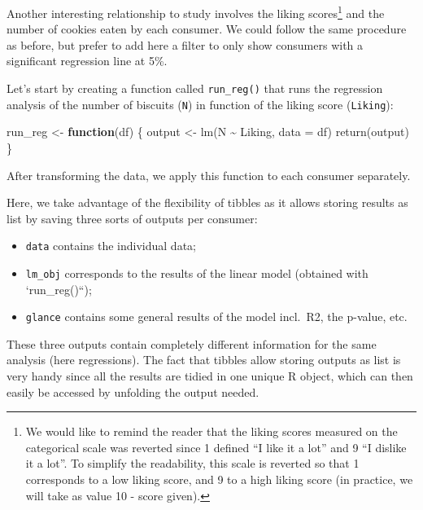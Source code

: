 \documentclass[
]{krantz}
\makeatletter
\newenvironment{Shaded}{\begin{snugshade}}{\end{snugshade}}
\newcommand{\AttributeTok}[1]{\textcolor[rgb]{0.61,0.61,0.61}{#1}}
\newcommand{\ControlFlowTok}[1]{\textcolor[rgb]{0.27,0.27,0.27}{\textbf{#1}}}
\newcommand{\FunctionTok}[1]{\textcolor[rgb]{0,0,0}{#1}}
\newcommand{\NormalTok}[1]{#1}
\newcommand{\OtherTok}[1]{\textcolor[rgb]{0.37,0.37,0.37}{#1}}
\newcommand{\SpecialCharTok}[1]{\textcolor[rgb]{0,0,0}{#1}}
\providecommand{\tightlist}{%
  \setlength{\itemsep}{0pt}\setlength{\parskip}{0pt}}
\renewenvironment{quote}{\begin{VF}}{\end{VF}}
\newenvironment{kframe}{%
\medskip{}
\setlength{\fboxsep}{.8em}
 \def\at@end@of@kframe{}%
 \ifinner\ifhmode%
  \def\at@end@of@kframe{\end{minipage}}%
  \begin{minipage}{\columnwidth}%
 \fi\fi%
 \def\FrameCommand##1{\hskip\@totalleftmargin \hskip-\fboxsep
 \colorbox{shadecolor}{##1}\hskip-\fboxsep
     \hskip-\linewidth \hskip-\@totalleftmargin \hskip\columnwidth}%
 \MakeFramed {\advance\hsize-\width
   \@totalleftmargin\z@ \linewidth\hsize
   \@setminipage}}%
 {\par\unskip\endMakeFramed%
 \at@end@of@kframe}
\renewenvironment{Shaded}{\begin{kframe}}{\end{kframe}}
\makeatother
\begin{document}
Another interesting relationship to study involves the liking scores\footnote{We would like to remind the reader that the liking scores measured on the categorical scale was reverted since 1 defined ``I like it a lot'' and 9 ``I dislike it a lot''. To simplify the readability, this scale is reverted so that 1 corresponds to a low liking score, and 9 to a high liking score (in practice, we will take as value 10 - score given).} and the number of cookies eaten by each consumer. We could follow the same procedure as before, but prefer to add here a filter to only show consumers with a significant regression line at 5\%.

Let's start by creating a function called \texttt{run\_reg()} that runs the regression analysis of the number of biscuits (\texttt{N}) in function of the liking score (\texttt{Liking}):

\begin{Shaded}
\begin{Highlighting}[]
\NormalTok{run\_reg }\OtherTok{\textless{}{-}} \ControlFlowTok{function}\NormalTok{(df) \{}
\NormalTok{  output }\OtherTok{\textless{}{-}} \FunctionTok{lm}\NormalTok{(N }\SpecialCharTok{\textasciitilde{}}\NormalTok{ Liking, }\AttributeTok{data =}\NormalTok{ df)}
  \FunctionTok{return}\NormalTok{(output)}
\NormalTok{\}}
\end{Highlighting}
\end{Shaded}

After transforming the data, we apply this function to each consumer separately.

Here, we take advantage of the flexibility of tibbles as it allows storing results as list by saving three sorts of outputs per consumer:

\begin{itemize}
\tightlist
\item
  \texttt{data} contains the individual data;
\item
  \texttt{lm\_obj} corresponds to the results of the linear model (obtained with `run\_reg()``);
\item
  \texttt{glance} contains some general results of the model incl.~R2, the p-value, etc.
\end{itemize}

\begin{quote}
These three outputs contain completely different information for the same analysis (here regressions). The fact that tibbles allow storing outputs as list is very handy since all the results are tidied in one unique R object, which can then easily be accessed by unfolding the output needed.
\end{quote}
\end{document}

